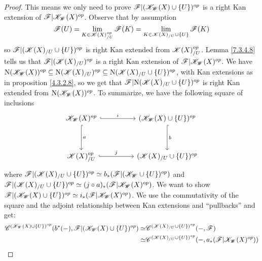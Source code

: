 \documentclass[../thesis.tex]{subfiles}
\begin{document}
\begin{proof}
    This means we only need to prove $\mathscr{F}|(\mathscr{K}_{\mathscr{W}}(X)\cup \{U\})^{op}$ is a right Kan extension of $\mathscr{F}|\mathscr{K}_{\mathscr{W}}(X)^{op}$.
    Observe that by assumption
    \[
        \mathscr{F}(U)  = \lim_{K\in \mathscr{K}(X)_{/U}^{op}} \mathscr{F}(K) = \lim_{K\in \mathscr{K}(X)_{/U} \cup \{U\}} \mathscr{F}(K)
    \]
    so $\mathscr{F}|(\mathscr{K}(X)_{/U} \cup \{U\})^{op}$ is right Kan extended from $\mathscr{K}(X)_{/U}^{op}$.
    Lemma \ref{7.3.4.8} tells us that $\mathscr{F}|(\mathscr{K}(X)_{/U})^{op}$ is a right Kan extension of $\mathscr{F}|\mathscr{K}_{\mathscr{W}}(X)^{op}$.
    We have $\mathrm{N}(\mathscr{K}_{\mathscr{W}}(X))^{op} \subseteq
        \mathrm{N}(\mathscr{K}(X)_{/U})^{op} \subseteq
        \mathrm{N}(\mathscr{K}(X)_{/U} \cup \{U\})^{op}$, with Kan extensions as in proposition \ref{4.3.2.8}, so we get that ${\mathscr{F}|\mathrm{N}(\mathscr{K}(X)_{/U} \cup \{U\})^{op}}$ is right Kan extended from ${\mathrm{N}(\mathscr{K}_{\mathscr{W}}(X))^{op}}$.
    To summarize, we have the following square of inclusions
    \[\begin{tikzcd}
            {\K_{\W}(X)^{op}} && {(\K_{\W}(X)\cup \{U\})^{op}} \\
            \\
            {\K(X)_{/U}^{op}} && {(\K(X)_{/U} \cup \{U\})^{op}}
            \arrow["{b}", hook, from=1-3, to=3-3]
            \arrow["{j}", hook, from=3-1, to=3-3]
            \arrow["{a}", hook, from=1-1, to=3-1]
            \arrow["{i}" ,hook, from=1-1, to=1-3]
        \end{tikzcd}\]
    where $\mathscr{F}|(\mathscr{K}(X)_{/U} \cup \{ U \})^{op} \simeq b_*(\mathscr{F}|(\mathscr{K}_{\mathscr{W}} \cup \{U\})^{op})$ and $\mathscr{F}|(\mathscr{K}(X)_{/U} \cup \{U\})^{op} \simeq (j\circ a)_*(\mathscr{F}|\mathscr{K}_{\mathscr{W}}(X)^{op})$.
    We want to show $\mathscr{F}|(\mathscr{K}_{\mathscr{W}}(X) \cup \{U\})^{op} \simeq i_*(\mathscr{F}|\mathscr{K}_{\mathscr{W}}(X)^{op})$.
    We use the commutativity of the square and the adjoint relationship between Kan extensions and ``pullbacks'' and get:
    \begin{align}
        \C^{(\K_{\W}(X)\cup \{U\})^{op}}(b^*(\blank),\F|(\K_{\W}(X)\cup \{U\})^{op})\simeq & \C^{(\K(X)_{/U} \cup \{U\})^{op}}(\blank, \F)                          \\       \simeq                                                                             & \C^{(\K(X)_{/U} \cup \{U\})^{op}}(\blank,a_*(\F|\K_{\W}(X)^{op})) \\

\end{align}
\end{proof}
\end{document}
